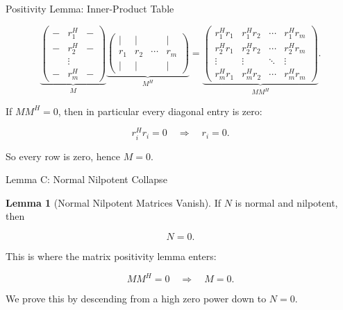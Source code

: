 \documentclass[10pt]{beamer}
\theoremstyle{definition}
\newtheorem{lem}{Lemma}[section]
\begin{document}
\begin{frame}{Positivity Lemma: Inner-Product Table}

\[
\underbrace{
\begin{pmatrix}
-&r_1^H&-\\
-&r_2^H&-\\
 &\vdots& \\
-&r_m^H&-
\end{pmatrix}}_{M}
\underbrace{
\begin{pmatrix}
|&|&&|\\
r_1&r_2&\cdots&r_m\\
|&|&&|
\end{pmatrix}}_{M^H}
=
\underbrace{
\begin{pmatrix}
r_1^Hr_1&r_1^Hr_2&\cdots&r_1^Hr_m\\
r_2^Hr_1&r_2^Hr_2&\cdots&r_2^Hr_m\\
\vdots&\vdots&\ddots&\vdots\\
r_m^Hr_1&r_m^Hr_2&\cdots&r_m^Hr_m
\end{pmatrix}}_{MM^H}.
\]

\vfill

If $MM^H=0$, then in particular every diagonal entry is zero:

$$
r_i^Hr_i=0\quad\Longrightarrow\quad r_i=0.
$$

\vfill

So every row is zero, hence $M=0$.

\end{frame}


\begin{frame}{Lemma C: Normal Nilpotent Collapse}

\begin{lem}[Normal Nilpotent Matrices Vanish]
If $N$ is normal and nilpotent, then

$$
N=0.
$$
\end{lem}

\vfill

This is where the matrix positivity lemma enters:

$$
MM^H=0\quad\Longrightarrow\quad M=0.
$$

\vfill

We prove this by descending from a high zero power down to $N=0$.

\end{frame}
\end{document}
